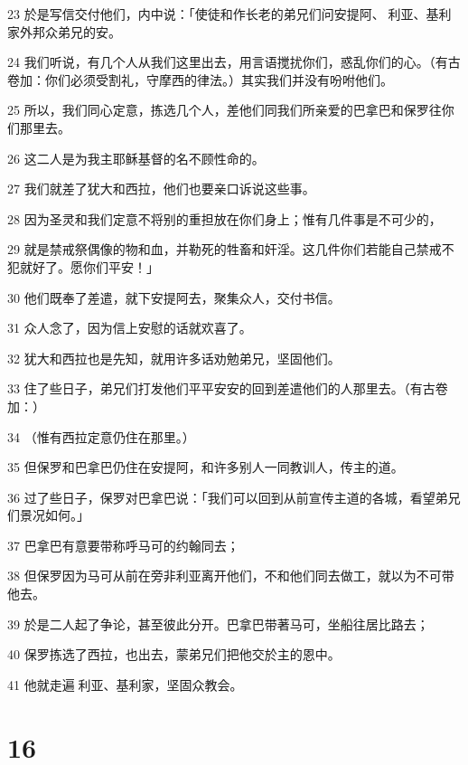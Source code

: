 \par 23 於是写信交付他们，内中说：「使徒和作长老的弟兄们问安提阿、利亚、基利家外邦众弟兄的安。
\par 24 我们听说，有几个人从我们这里出去，用言语搅扰你们，惑乱你们的心。（有古卷加：你们必须受割礼，守摩西的律法。）其实我们并没有吩咐他们。
\par 25 所以，我们同心定意，拣选几个人，差他们同我们所亲爱的巴拿巴和保罗往你们那里去。
\par 26 这二人是为我主耶稣基督的名不顾性命的。
\par 27 我们就差了犹大和西拉，他们也要亲口诉说这些事。
\par 28 因为圣灵和我们定意不将别的重担放在你们身上；惟有几件事是不可少的，
\par 29 就是禁戒祭偶像的物和血，并勒死的牲畜和奸淫。这几件你们若能自己禁戒不犯就好了。愿你们平安！」
\par 30 他们既奉了差遣，就下安提阿去，聚集众人，交付书信。
\par 31 众人念了，因为信上安慰的话就欢喜了。
\par 32 犹大和西拉也是先知，就用许多话劝勉弟兄，坚固他们。
\par 33 住了些日子，弟兄们打发他们平平安安的回到差遣他们的人那里去。（有古卷加：）
\par 34 （惟有西拉定意仍住在那里。）
\par 35 但保罗和巴拿巴仍住在安提阿，和许多别人一同教训人，传主的道。
\par 36 过了些日子，保罗对巴拿巴说：「我们可以回到从前宣传主道的各城，看望弟兄们景况如何。」
\par 37 巴拿巴有意要带称呼马可的约翰同去；
\par 38 但保罗因为马可从前在旁非利亚离开他们，不和他们同去做工，就以为不可带他去。
\par 39 於是二人起了争论，甚至彼此分开。巴拿巴带著马可，坐船往居比路去；
\par 40 保罗拣选了西拉，也出去，蒙弟兄们把他交於主的恩中。
\par 41 他就走遍利亚、基利家，坚固众教会。

\chapter{16}

